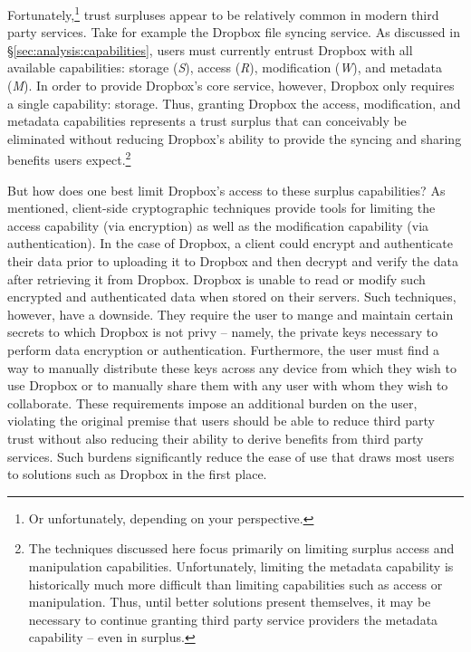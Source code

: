 Fortunately,\footnote{Or unfortunately, depending on your
  perspective.} trust surpluses appear to be relatively common in
modern third party services. Take for example the Dropbox file syncing
service. As discussed in \S\ref{sec:analysis:capabilities}, users
must currently entrust Dropbox with all available capabilities:
storage (\emph{S}), access (\emph{R}), modification (\emph{W}), and
metadata (\emph{M}). In order to provide Dropbox's core service,
however, Dropbox only requires a single capability: storage. Thus,
granting Dropbox the access, modification, and metadata capabilities
represents a trust surplus that can conceivably be eliminated without
reducing Dropbox's ability to provide the syncing and sharing benefits
users expect.\footnote{The techniques discussed here focus primarily
  on limiting surplus access and manipulation
  capabilities. Unfortunately, limiting the metadata capability is
  historically much more difficult than limiting capabilities such as
  access or manipulation. Thus, until better solutions present
  themselves, it may be necessary to continue granting third party
  service providers the metadata capability -- even in surplus.}

But how does one best limit Dropbox's access to these surplus
capabilities? As mentioned, client-side cryptographic techniques
provide tools for limiting the access capability (via encryption) as
well as the modification capability (via authentication). In the case
of Dropbox, a client could encrypt and authenticate their data prior
to uploading it to Dropbox and then decrypt and verify the data after
retrieving it from Dropbox. Dropbox is unable to read or modify such
encrypted and authenticated data when stored on their servers. Such
techniques, however, have a downside. They require the user to mange
and maintain certain secrets to which Dropbox is not privy -- namely,
the private keys necessary to perform data encryption or
authentication. Furthermore, the user must find a way to manually
distribute these keys across any device from which they wish to use
Dropbox or to manually share them with any user with whom they wish to
collaborate. These requirements impose an additional burden on the
user, violating the original premise that users should be able to
reduce third party trust without also reducing their ability to derive
benefits from third party services. Such burdens significantly reduce
the ease of use that draws most users to solutions such as Dropbox in
the first place.

